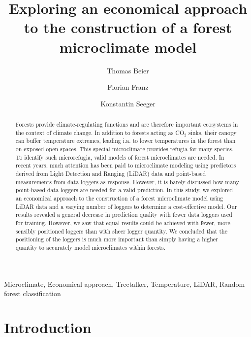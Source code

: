 \documentclass[5p]{elsarticle} %
\begin{document}
\begin{frontmatter}

  \title{Exploring an economical approach to the construction of a forest microclimate model}
    \author[Philipps-University Marburg]{Thomas Beier}
    \author[Philipps-University Marburg]{Florian Franz}
    \author[Philipps-University Marburg]{Konstantin Seeger}
      \address[Philipps-University Marburg]{Philipps-University Marburg,
FB 19 Geography, Deutschhausstraße 10, 35032 Marburg, Germany}
    
  \begin{abstract}
Forests provide climate-regulating functions and are therefore important ecosystems in the context of climate change. In addition to forests acting as CO$_{2}$ sinks, their canopy can buffer temperature extremes, leading i.a. to lower temperatures in the forest than on exposed open spaces. This special microclimate provides refugia for many species. To identify such microrefugia, valid models of forest microclimates are needed. In recent years, much attention has been paid to microclimate modeling using predictors derived from Light Detection and Ranging (LiDAR) data and point-based measurements from data loggers as response. However, it is barely discussed how many point-based data loggers are needed for a valid prediction. In this study, we explored an economical approach to the construction of a forest microclimate model using LiDAR data and a varying number of loggers to determine a cost-effective model. Our results revealed a general decrease in prediction quality with fewer data loggers used for training. However, we saw that equal results could be achieved with fewer, more sensibly positioned loggers than with sheer logger quantity. We concluded that the positioning of the loggers is much more important than simply having a higher quantity to accurately model microclimates within forests.

  \end{abstract}
   \begin{keyword} Microclimate, Economical approach, Treetalker, Temperature, LiDAR, Random forest classification\end{keyword}
 \end{frontmatter}

\newpage

\hypertarget{introduction}{%
\section{Introduction}\label{introduction}}
\end{document}
